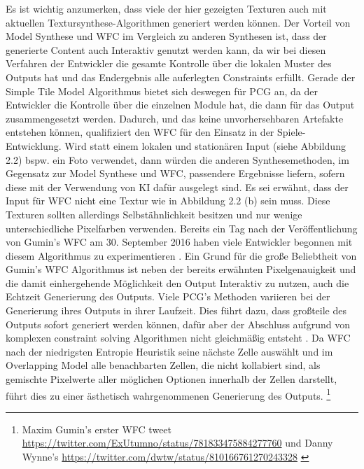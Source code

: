 \documentclass[12pt, a4paper,twoside,openright]{report} %
\begin{document}
Es ist wichtig anzumerken, dass viele der hier gezeigten Texturen auch mit aktuellen Textursynthese-Algorithmen generiert werden können.
Der Vorteil von Model Synthese und WFC im Vergleich zu anderen Synthesen ist, dass der generierte Content auch Interaktiv genutzt werden kann,
da wir bei diesen Verfahren der Entwickler die gesamte Kontrolle über die lokalen Muster des Outputs hat und das Endergebnis alle auferlegten Constraints erfüllt.
Gerade der Simple Tile Model Algorithmus bietet sich deswegen für PCG an, da der Entwickler die Kontrolle über die einzelnen Module hat,
die dann für das Output zusammengesetzt werden.
Dadurch, und das keine unvorhersehbaren Artefakte entstehen können, qualifiziert den WFC für den Einsatz in der Spiele-Entwicklung.
Wird statt einem lokalen und stationären Input {(siehe Abbildung 2.2)} bspw. ein Foto verwendet,
dann würden die anderen Synthesemethoden, im Gegensatz zur Model Synthese und WFC, passendere Ergebnisse liefern, sofern diese mit der Verwendung von KI dafür ausgelegt sind.
Es sei erwähnt, dass der Input für WFC nicht  eine Textur wie in Abbildung 2.2 {(b)} sein muss.
Diese Texturen sollten allerdings Selbstähnlichkeit besitzen und nur wenige unterschiedliche Pixelfarben verwenden.
Bereits ein Tag nach der Veröffentlichung von Gumin's WFC am 30. September 2016 haben viele Entwickler begonnen mit diesem Algorithmus zu experimentieren \cite{Karth2017WaveFunctionCollapseIC}.
Ein Grund für die große Beliebtheit von Gumin's WFC Algorithmus ist neben der bereits erwähnten Pixelgenauigkeit und die damit einhergehende Möglichkeit den Output Interaktiv zu nutzen,
auch die Echtzeit Generierung des Outputs.
Viele PCG's Methoden variieren bei der Generierung ihres Outputs in ihrer Laufzeit.
Dies führt dazu, dass großteile des Outputs sofort generiert werden können,
dafür aber der Abschluss aufgrund von komplexen constraint solving Algorithmen nicht gleichmäßig entsteht \cite{Karth2017WaveFunctionCollapseIC}.
Da WFC nach der niedrigsten Entropie Heuristik seine nächste Zelle auswählt und im Overlapping Model alle benachbarten Zellen, die nicht kollabiert sind,
als gemischte Pixelwerte aller möglichen Optionen innerhalb der Zellen darstellt, führt dies zu einer ästhetisch wahrgenommenen Generierung des Outputs.
\footnote[4]{Maxim Gumin’s erster WFC tweet 
\newline
\url{https://twitter.com/ExUtumno/status/781833475884277760}
\newline
und Danny Wynne’s 
\newline
\url{https://twitter.com/dwtw/status/810166761270243328} \cite{Karth2017WaveFunctionCollapseIC}}
\end{document}
